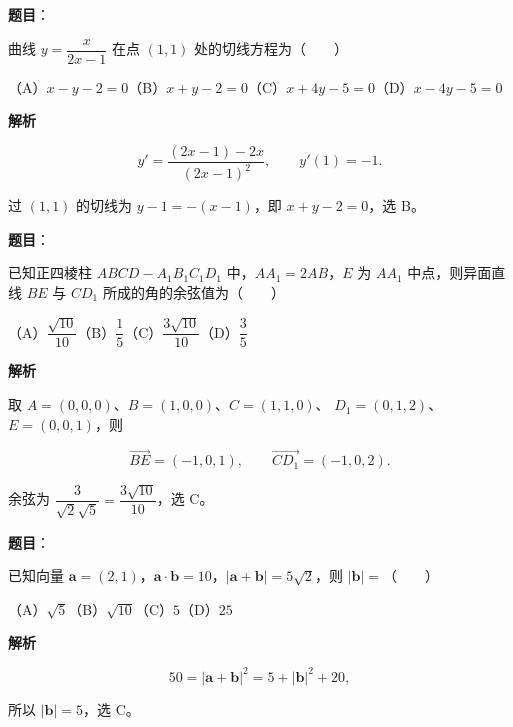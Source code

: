 \begin{answer}

\textbf{题目}：

曲线 $y=\dfrac{x}{2x-1}$ 在点 $(1,1)$ 处的切线方程为\mbox{（　　）}

（A）$x-y-2=0$\quad（B）$x+y-2=0$\quad（C）$x+4y-5=0$\quad（D）$x-4y-5=0$

\textbf{解析}

\nopagebreak[4]
\[
y'=\frac{(2x-1)-2x}{(2x-1)^2},
\qquad y'(1)=-1.
\]

过 $(1,1)$ 的切线为 $y-1=-(x-1)$，即 $x+y-2=0$，选 B。


\end{answer}
\begin{answer}

\textbf{题目}：

已知正四棱柱 $ABCD-A_1B_1C_1D_1$ 中，$AA_1=2AB$，$E$ 为 $AA_1$ 中点，则异面直线 $BE$ 与 $CD_1$ 所成的角的余弦值为\mbox{（　　）}

（A）$\dfrac{\sqrt{10}}{10}$\quad（B）$\dfrac15$\quad（C）$\dfrac{3\sqrt{10}}{10}$\quad（D）$\dfrac35$

\textbf{解析}

取 $A=(0,0,0)$、$B=(1,0,0)$、$C=(1,1,0)$、
$D_1=(0,1,2)$、$E=(0,0,1)$，则

\nopagebreak[4]
\[
\overrightarrow{BE}=(-1,0,1),\qquad
\overrightarrow{CD_1}=(-1,0,2).
\]

余弦为 $\dfrac3{\sqrt2\sqrt5}=\dfrac{3\sqrt{10}}{10}$，选 C。


\end{answer}
\begin{answer}

\textbf{题目}：

已知向量 $\boldsymbol a=(2,1)$，$\boldsymbol a\cdot\boldsymbol b=10$，$|\boldsymbol a+\boldsymbol b|=5\sqrt2$，则 $|\boldsymbol b|=$\mbox{（　　）}

（A）$\sqrt5$\quad（B）$\sqrt{10}$\quad（C）$5$\quad（D）$25$

\textbf{解析}

\nopagebreak[4]
\[
50=|\boldsymbol a+\boldsymbol b|^2
=5+|\boldsymbol b|^2+20,
\]

所以 $|\boldsymbol b|=5$，选 C。


\end{answer}
